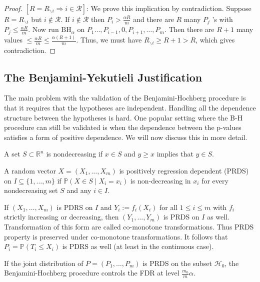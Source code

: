 \begin{proof}
$\left[R=R_{\backslash i} \Rightarrow i \in \mathcal{R}\right]$: We prove this implication by contradiction. Suppose $R=R_{\backslash i}$ but $i \notin \mathcal{R}$. If $i \notin \mathcal{R}$ then $P_i>\frac{\alpha R}{m}$ and there are $R$ many $P_j$ 's with $P_j \leq \frac{\alpha R}{m}$. Now run $\mathrm{BH}_\alpha$ on $P_1 \ldots, P_{i-1}, 0, P_{i+1}, \ldots, P_m$. Then there are $R+1$ many values $\leq \frac{\alpha R}{m} \leq \frac{\alpha(R+1)}{m}$. Thus, we must have $R_{\backslash i} \geq R+1>R$, which gives contradiction.
\end{proof}

\subsection{The Benjamini-Yekutieli Justification}

The main problem with the validation of the Benjamini-Hochberg procedure is that it requires that the hypotheses are independent. Handling all the dependence structure between the hypotheses is hard. One popular setting where the B-H procedure can still be validated is when the dependence between the p-values satisfies a form of positive dependence. We will now discuss this in more detail.
\begin{de}
    A set $S \subset \mathbb{R}^n$ is nondecreasing if $x \in S$ and $y \geq x$ implies that $y \in S$.
\end{de}

\begin{de}
    A random vector $X=\left(X_1, \ldots, X_m\right)$ is positively regression dependent (PRDS) on $I \subseteq\{1, \ldots, m\}$  if $\mathbb{P}\left(X \in S \mid X_i=x_i\right)$ is non-decreasing in $x_i$ for every nondecreasing set $S$ and any $i \in I$.
\end{de}


If $\left(X_1, \ldots, X_m\right)$ is PDRS on $I$ and $Y_i:=f_i\left(X_i\right)$ for all $1 \leq i \leq m$ with $f_i$ strictly increasing or decreasing, then $\left(Y_1, \ldots, Y_m\right)$ is PRDS on $I$ as well. Transformation of this form are called co-monotone transformations. Thus PRDS property is preserved under co-monotone transformations. It follows that $P_i=\mathbb{P}\left(T_i \leq X_i\right)$ is PDRS as well (at least in the continuous case).
\begin{thm}
    If the joint distribution of $P=\left(P_1, \ldots, P_m\right)$ is PRDS on the subset $\mathcal{H}_0$, the Benjamini-Hochberg procedure controls the FDR at level $\frac{m_0}{m} \alpha$.
\end{thm}


